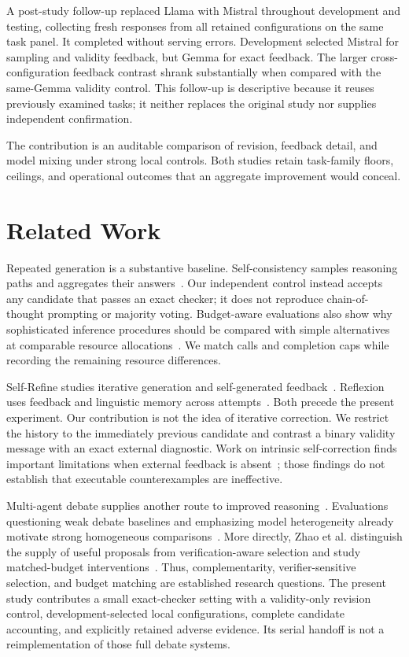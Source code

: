 A post-study follow-up replaced Llama with Mistral throughout development and testing, collecting fresh responses from all retained configurations on the same task panel. It completed without serving errors. Development selected Mistral for sampling and validity feedback, but Gemma for exact feedback. The larger cross-configuration feedback contrast shrank substantially when compared with the same-Gemma validity control. This follow-up is descriptive because it reuses previously examined tasks; it neither replaces the original study nor supplies independent confirmation.

The contribution is an auditable comparison of revision, feedback detail, and model mixing under strong local controls. Both studies retain task-family floors, ceilings, and operational outcomes that an aggregate improvement would conceal.

\section{Related Work}

Repeated generation is a substantive baseline. Self-consistency samples reasoning paths and aggregates their answers~\cite{wang2023selfconsistency}. Our independent control instead accepts any candidate that passes an exact checker; it does not reproduce chain-of-thought prompting or majority voting. Budget-aware evaluations also show why sophisticated inference procedures should be compared with simple alternatives at comparable resource allocations~\cite{wang2024tokeneconomies}. We match calls and completion caps while recording the remaining resource differences.

Self-Refine studies iterative generation and self-generated feedback~\cite{madaan2023selfrefine}. Reflexion uses feedback and linguistic memory across attempts~\cite{shinn2023reflexion}. Both precede the present experiment. Our contribution is not the idea of iterative correction. We restrict the history to the immediately previous candidate and contrast a binary validity message with an exact external diagnostic. Work on intrinsic self-correction finds important limitations when external feedback is absent~\cite{huang2024selfcorrect}; those findings do not establish that executable counterexamples are ineffective.

Multi-agent debate supplies another route to improved reasoning~\cite{du2024debate}. Evaluations questioning weak debate baselines and emphasizing model heterogeneity already motivate strong homogeneous comparisons~\cite{zhang2025overvaluing}. More directly, Zhao et al. distinguish the supply of useful proposals from verification-aware selection and study matched-budget interventions~\cite{zhao2026debate}. Thus, complementarity, verifier-sensitive selection, and budget matching are established research questions. The present study contributes a small exact-checker setting with a validity-only revision control, development-selected local configurations, complete candidate accounting, and explicitly retained adverse evidence. Its serial handoff is not a reimplementation of those full debate systems.

